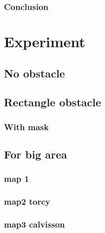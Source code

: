 		\subsubsection{Conclusion}
		
\section{Experiment}
	\subsection{No obstacle }
	\subsection{Rectangle obstacle}
	\subsubsection{With mask}
	\subsection{For big area}
		\subsubsection{map 1}
		\subsubsection{map2 torcy}
		\subsubsection{map3 calvisson}
		



 



